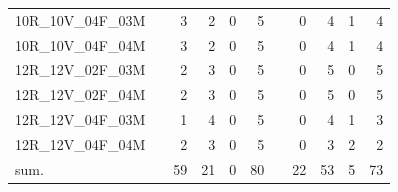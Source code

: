 \begin{tabular}{llrrrrlrrrr}
10R\_10V\_04F\_03M & \hspace{0.1cm} & 3 & 2 & 0 & 5 & \hspace{0.2cm} & 0 & 4 & 1 & 4\\
10R\_10V\_04F\_04M & \hspace{0.1cm} & 3 & 2 & 0 & 5 & \hspace{0.2cm} & 0 & 4 & 1 & 4\\
\addlinespace
12R\_12V\_02F\_03M & \hspace{0.1cm} & 2 & 3 & 0 & 5 & \hspace{0.2cm} & 0 & 5 & 0 & 5\\
12R\_12V\_02F\_04M & \hspace{0.1cm} & 2 & 3 & 0 & 5 & \hspace{0.2cm} & 0 & 5 & 0 & 5\\
12R\_12V\_04F\_03M & \hspace{0.1cm} & 1 & 4 & 0 & 5 & \hspace{0.2cm} & 0 & 4 & 1 & 3\\
12R\_12V\_04F\_04M & \hspace{0.1cm} & 2 & 3 & 0 & 5 & \hspace{0.2cm} & 0 & 3 & 2 & 2\\
\addlinespace
sum. & \hspace{0.1cm} & 59 & 21 & 0 & 80 & \hspace{0.2cm} & 22 & 53 & 5 & 73\\
\bottomrule
\end{tabular}
